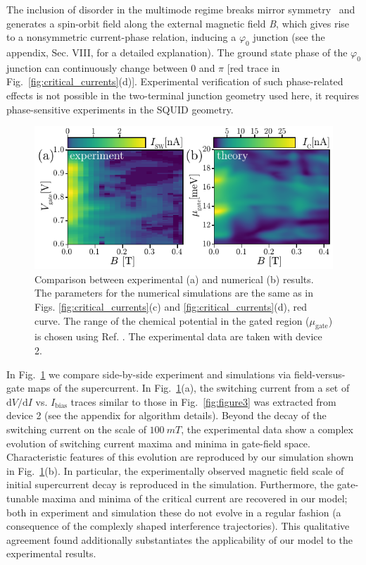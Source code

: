 The inclusion of disorder in the multimode regime breaks mirror symmetry~\cite{Yokoyama2014,Yokoyama2014a} and generates a spin-orbit field along the external magnetic field \textit{B}, which gives rise to a nonsymmetric current-phase relation, inducing a $\varphi_0$ junction (see the appendix, Sec. VIII, for a detailed explanation).
The ground state phase of the $\varphi_0$ junction can continuously change between 0 and $\pi$ [red trace in Fig.~\ref{fig:critical_currents}(d)].
Experimental verification of such phase-related effects is not possible in the two-terminal junction geometry used here, it requires phase-sensitive experiments in the SQUID geometry.

\begin{figure}[t]
\includegraphics[width=\columnwidth]{chapter_supercurrent/figures/fig5.pdf}
\caption{Comparison between experimental (a) and numerical (b) results.
The parameters for the numerical simulations are the same as in Figs. \ref{fig:critical_currents}(c) and \ref{fig:critical_currents}(d), red curve.
The range of the chemical potential in the gated region ($\mu_{\textrm{gate}}$) is chosen using Ref. \cite{Vuik2016}. The experimental data are taken with device 2.}
\label{fig:figure5}
\end{figure}

In Fig.~\ref{fig:figure5} we compare side-by-side experiment and simulations via field-versus-gate maps of the supercurrent.
In Fig.~\ref{fig:figure5}(a), the switching current from a set of $\mathrm{d}V/\mathrm{d}I$ vs. $I_\textrm{bias}$ traces similar to those in Fig.~\ref{fig:figure3} was extracted from device 2 (see the appendix for algorithm details).
Beyond the decay of the switching current on the scale of $\SI{100}{mT}$, the experimental data show a complex evolution of switching current maxima and minima in gate-field space.
Characteristic features of this evolution are reproduced by our simulation shown in Fig.~\ref{fig:figure5}(b).
In particular, the experimentally observed magnetic field scale of initial supercurrent decay is reproduced in the simulation.
Furthermore, the gate-tunable maxima and minima of the critical current are recovered in our model; both in experiment and simulation these do not evolve in a regular fashion (a consequence of the complexly shaped interference trajectories).
This qualitative agreement found additionally substantiates the applicability of our model to the experimental results.

